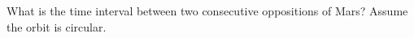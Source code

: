 What is the time interval between two consecutive oppositions of Mars? Assume
the orbit is circular.
